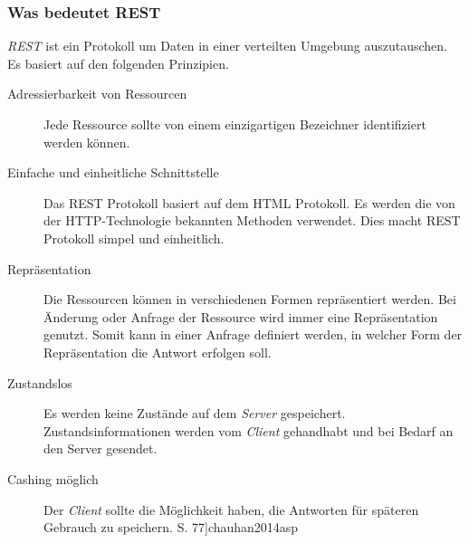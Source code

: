 \documentclass[12pt, paper=a4, bibtotoc, toc=listof, headsepline=true]{scrreprt}
\renewcommand{\smfootcite}[2][2]{\relax}
\begin{document}
			\subsubsection{Was bedeutet REST}
			\emph{\ac{REST}} ist ein Protokoll um Daten in einer verteilten Umgebung auszutauschen. Es basiert auf den folgenden Prinzipien.
			\begin{description}  
				\item  [Adressierbarkeit von Ressourcen]
				Jede Ressource sollte von einem einzigartigen Bezeichner identifiziert werden können.
				\item [Einfache und einheitliche Schnittstelle]
				Das \ac{REST} Protokoll basiert auf dem \ac{HTML} Protokoll. Es werden die von der \ac{HTTP}-Technologie bekannten Methoden verwendet. Dies macht \ac{REST} Protokoll simpel und einheitlich.
				\item  [Repräsentation] 
				Die Ressourcen können in verschiedenen Formen repräsentiert werden. Bei Änderung oder Anfrage der Ressource wird immer eine Repräsentation genutzt. Somit kann in einer Anfrage definiert werden, in welcher Form der Repräsentation die Antwort erfolgen soll.
				\item [Zustandslos]
				Es werden keine Zustände auf dem \emph{Server} gespeichert. Zustandsinformationen werden vom \emph{Client} gehandhabt und bei Bedarf an den Server gesendet.
				\item [Cashing möglich]
				Der \emph{Client} sollte die Möglichkeit haben,  die Antworten für späteren Gebrauch zu speichern.	\smfootcite[ vgl.][S. 77]{chauhan2014asp} 
			\end{description}
\end{document}
